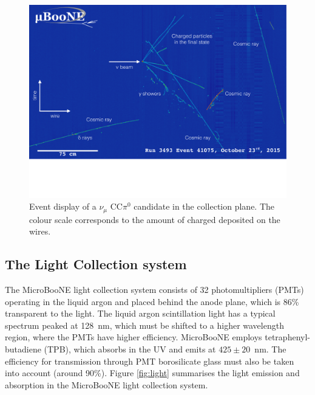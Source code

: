 \begin{figure}[htbp]
    \centering
    \includegraphics[width=0.9\linewidth]{figures/evd_ccpi0.pdf}
    \caption{Event display of a $\nu_{\mu}$ CC$\pi^0$ candidate in the collection plane. The colour scale corresponds to the amount of charged deposited on the wires.}
    \label{fig:evd_ccpi0}
\end{figure}


\subsection{The Light Collection system}
The MicroBooNE light collection system consists of 32 photomultipliers (PMTs) operating in the liquid argon and placed behind the anode plane, which is 86\% transparent to the light.
The liquid argon scintillation light has a typical spectrum peaked at 128~nm, which must be shifted to a higher wavelength region, where the PMTs have higher efficiency.
MicroBooNE employs tetraphenyl-butadiene (TPB), which absorbs in the UV and emits at $425\pm20$~nm. The efficiency for transmission through PMT borosilicate glass must also be taken into account (around 90\%).
Figure \ref{fig:light} summarises the light emission and absorption in the MicroBooNE light collection system.

